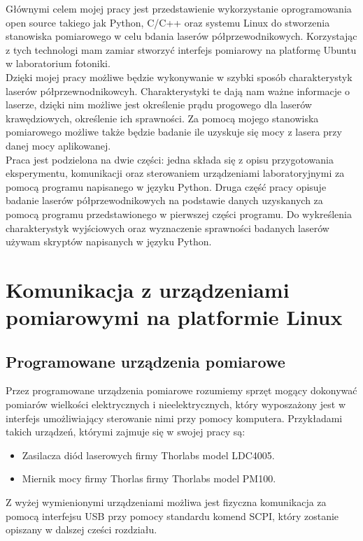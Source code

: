 \documentclass[a4paper, portrait,12pt]{report}
\begin{document}
Głównymi celem mojej pracy jest przedstawienie wykorzystanie oprogramowania
open source takiego jak Python, C/C++ oraz systemu Linux do stworzenia stanowiska pomiarowego w celu bdania laserów półprzewodnikowych. Korzystając z tych technologi mam zamiar stworzyć interfejs pomiarowy na platformę Ubuntu
w laboratorium fotoniki. \\
Dzięki mojej pracy możliwe będzie wykonywanie w szybki sposób charakterystyk laserów półprzewnodnikowcyh. Charakterystyki te dają nam ważne informacje o laserze, dzięki nim możliwe jest określenie prądu progowego dla laserów krawędziowych, określenie ich sprawności. Za pomocą mojego stanowiska pomiarowego możliwe także będzie badanie ile uzyskuje się mocy z lasera przy danej mocy aplikowanej. \\
Praca jest podzielona na dwie części: jedna składa się z opisu przygotowania eksperymentu, komunikacji oraz sterowaniem urządzeniami laboratoryjnymi za pomocą programu napisanego w języku Python. Druga część pracy opisuje badanie laserów półprzewodnikowych na podstawie danych uzyskanych za pomocą programu przedstawionego w pierwszej części programu. Do wykreślenia charakterystyk wyjściowych oraz wyznaczenie sprawności badanych laserów używam skryptów napisanych w języku Python.



\chapter{Komunikacja z urządzeniami pomiarowymi na platformie Linux}
\section{Programowane urządzenia pomiarowe}
Przez  programowane urządzenia pomiarowe rozumiemy sprzęt mogący dokonywać pomiarów wielkości elektrycznych i nieelektrycznych, który wyposzażony jest w interfejs umożliwiający sterowanie nimi przy pomocy komputera. Przykładami takich urządzeń, którymi zajmuje się w swojej pracy są:
\begin{itemize}
\item Zasilacza diód laserowych firmy Thorlabs model LDC4005.
\item Miernik mocy firmy Thorlas firmy Thorlabs model PM100.
\end{itemize}
Z wyżej wymienionymi urządzeniami możliwa jest fizyczna komunikacja za pomocą interfejsu USB przy pomocy standardu komend SCPI, który zostanie opiszany w dalszej cześci rozdziału.
\end{document}
